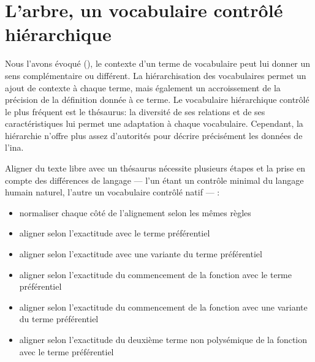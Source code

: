 \chapter{\label{I-C}L'arbre, un vocabulaire contrôlé hiérarchique}

Nous l'avons évoqué (), le contexte d'un terme de vocabulaire peut lui donner un sens complémentaire ou différent. La hiérarchisation des vocabulaires permet un ajout de contexte à chaque terme, mais également un accroissement de la précision de la définition donnée à ce terme. Le vocabulaire hiérarchique contrôlé le plus fréquent est le thésaurus: la diversité de ses relations et de ses caractéristiques lui permet une adaptation à chaque vocabulaire. Cependant, la hiérarchie n'offre plus assez d'autorités pour décrire précisément les données de l'\ac{ina}.








\bigskip
\bigskip
\bigskip
Aligner du texte libre avec un thésaurus nécessite plusieurs étapes et la prise en compte des différences de langage --- l'un étant un contrôle minimal du langage humain naturel, l'autre un vocabulaire contrôlé natif --- :
\begin{itemize}
	\item normaliser chaque côté de l'alignement selon les mêmes règles
	\item aligner selon l'exactitude avec le terme préférentiel
	\item aligner selon l'exactitude avec une variante du terme préférentiel
	\item aligner selon l'exactitude du commencement de la fonction avec le terme préférentiel
	\item aligner selon l'exactitude du commencement de la fonction avec une variante du terme préférentiel
	\item aligner selon l'exactitude du deuxième terme non polysémique de la fonction avec le terme préférentiel
\end{itemize}